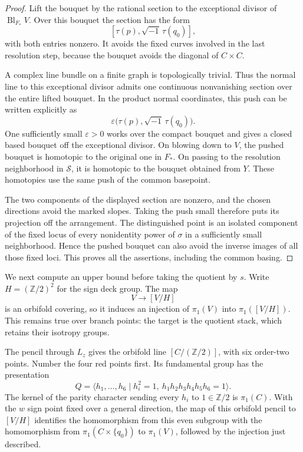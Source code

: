 \documentclass[11pt,reqno]{amsart}
\numberwithin{equation}{section}
\theoremstyle{definition}
\theoremstyle{remark}
\newcommand{\Z}{\mathbb Z}
\newcommand{\cS}{\mathcal S}
\begin{document}
\begin{proof}
Lift the bouquet by the rational section to the exceptional divisor of
$\operatorname{Bl}_{F_*}V$.  Over this bouquet the section has the form
\[
 [\tau(p),\sqrt{-1}\,\tau(q_0)],
\]
with both entries nonzero.  It avoids the fixed curves involved in the
last resolution step, because the bouquet avoids the diagonal of
$C\times C$.

A complex line bundle on a finite graph is topologically trivial.
Thus the normal line to this exceptional divisor admits one continuous
nonvanishing section over the entire lifted bouquet.  In the product normal coordinates, this push can be written
explicitly as
\[
 \varepsilon\bigl(\tau(p),\sqrt{-1}\,\tau(q_0)\bigr).
\]
One sufficiently small $\varepsilon>0$ works over the compact bouquet
and gives a closed based bouquet off the exceptional divisor.  On blowing down to $V$, the pushed bouquet is
homotopic to the original one in $F_*$.  On passing to the resolution
neighborhood in $\cS$, it is homotopic to the bouquet obtained from
$Y$.  These homotopies use the same push of the common basepoint.

The two components of the displayed section are nonzero, and the
chosen directions avoid the marked slopes.  Taking the push small
therefore puts its projection off the arrangement.  The distinguished
point is an isolated component of the fixed locus of every nonidentity
power of $\sigma$ in a sufficiently small neighborhood.  Hence the
pushed bouquet can also avoid the inverse images of all those fixed
loci.  This proves all the assertions, including the common basing.
\end{proof}

We next compute an upper bound before taking the quotient by $s$.
Write $H=(\Z/2)^2$ for the sign deck group.  The map
\[
 V\longrightarrow[V/H]
\]
is an orbifold covering, so it induces an injection of $\pi_1(V)$ into
$\pi_1([V/H])$.  This remains true over branch points: the target is the
quotient stack, which retains their isotropy groups.

The pencil through $L_z$ gives the orbifold line
$[C/(\Z/2)]$, with six order-two points.  Number the four red points
first.  Its fundamental group has the presentation
\begin{equation}\label{app:pencil-group}
 Q=\langle h_1,\ldots,h_6\mid
       h_i^2=1,\ h_1h_2h_3h_4h_5h_6=1\rangle.
\end{equation}
The kernel of the parity character sending every $h_i$ to $1\in\Z/2$
is $\pi_1(C)$.  With the $w$ sign point fixed over a general direction,
the map of this orbifold pencil to $[V/H]$ identifies the homomorphism
from this even subgroup with the homomorphism from
$\pi_1(C\times\{q_0\})$ to $\pi_1(V)$, followed by the injection just
described.
\end{document}
